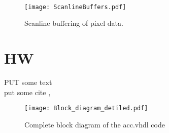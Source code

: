 \paragraph*{}

\begin{figure}[H]
	\centering
	\texttt{[image: ScanlineBuffers.pdf]}
	\caption{Scanline buffering of pixel data.}
	\label{fig:ScanlineBuffers}
\end{figure}


\section{HW}
\label{sec:hw}
PUT some text\\
put some cite \cite[p.11~eq.2.6]{Book}, \cite[p.11~eq.2.6]{Note}

\begin{figure}[H]
	\centering
	\texttt{[image: Block\_diagram\_detiled.pdf]}
	\caption{Complete block diagram of the acc.vhdl code}
	\label{fig:block_acc}
\end{figure}
